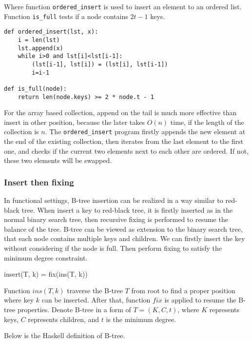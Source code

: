 \documentclass[UTF8]{article}
\begin{document}
Where function \texttt{ordered\_insert} is used to insert an element
to an ordered list. Function \texttt{is\_full} tests if a node contains
$2t-1$ keys.

\begin{lstlisting}
def ordered_insert(lst, x):
    i = len(lst)
    lst.append(x)
    while i>0 and lst[i]<lst[i-1]:
        (lst[i-1], lst[i]) = (lst[i], lst[i-1])
        i=i-1

def is_full(node):
    return len(node.keys) >= 2 * node.t - 1
\end{lstlisting}

For the array based collection, append on the tail is much more effective than
insert in other position, because the later takes $O(n)$ time, if the length
of the collection is $n$. The \texttt{ordered\_insert} program firstly appends
 the new element at the end of the existing collection, then iterates from the
last element to the first one, and checks if the current two elements next to each other
are ordered. If not, these two elements will be swapped.


\subsubsection{Insert then fixing}

In functional settings, B-tree insertion can be realized in a way similar to
red-black tree. When insert a key to red-black tree, it is firstly inserted
as in the normal binary search tree, then recursive fixing is performed to
resume the balance of the tree. B-tree can be viewed as extension to the
binary search tree, that each node contains multiple keys and children.
We can firstly insert the key without considering if the node is full.
Then perform fixing to satisfy the minimum degree constraint.

\be
insert(T, k) = fix(ins(T, k))
\ee

Function $ins(T, k)$ traverse the B-tree $T$ from root to find a proper
position where key $k$ can be inserted. After that, function $fix$ is
applied to resume the B-tree properties. Denote B-tree in a form of
$T = (K, C, t)$, where $K$ represents keys, $C$ represents children,
and $t$ is the minimum degree.

Below is the Haskell definition of B-tree.
\end{document}
